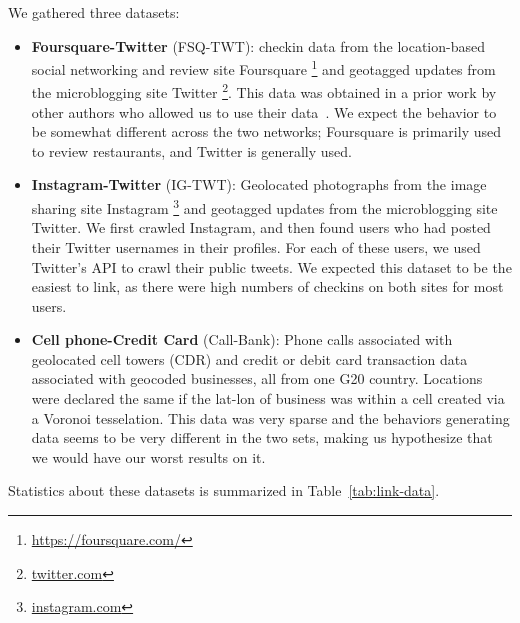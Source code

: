 We gathered three datasets:
\begin{itemize}
  \item \textbf{Foursquare-Twitter} (FSQ-TWT): 
  checkin data from the location-based social networking and review site Foursquare \footnote{\url{https://foursquare.com/}} and geotagged updates from the microblogging site Twitter \footnote{\url{twitter.com}}. 
  This data was obtained in a prior work by other authors who allowed us to use their data~\cite{Zhang:2014ij}.
  We expect the behavior to be somewhat different across the two networks; Foursquare is primarily used to review restaurants, and Twitter is generally used.

  \item \textbf{Instagram-Twitter} (IG-TWT):
  Geolocated photographs from the image sharing site Instagram \footnote{\url{instagram.com}} and geotagged updates from the microblogging site Twitter.
  We first crawled Instagram, and then found users who had posted their Twitter usernames in their profiles.
  For each of these users, we used Twitter's API to crawl their public tweets.
  We expected this dataset to be the easiest to link, as there were high numbers of checkins on both sites for most users.

  \item \textbf{Cell phone-Credit Card} (Call-Bank):
  Phone calls associated with geolocated cell towers (CDR) and credit or debit card transaction data associated with geocoded businesses, all from one G20 country.
  Locations were declared the same if the lat-lon of business was within a cell created via a Voronoi tesselation.
  This data was very sparse and the behaviors generating data seems to be very different in the two sets, making us hypothesize that we would have our worst results on it.
\end{itemize}

Statistics about these datasets is summarized in Table~\ref{tab:link-data}.


